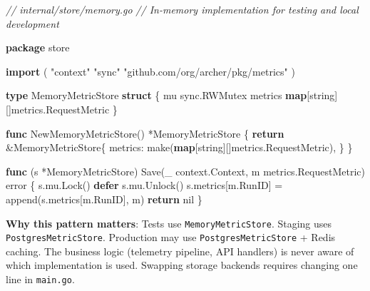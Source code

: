 \documentclass[
]{article}
\newenvironment{Shaded}{}{}
\newcommand{\BuiltInTok}[1]{\textcolor[rgb]{0.00,0.50,0.00}{#1}}
\newcommand{\CommentTok}[1]{\textcolor[rgb]{0.38,0.63,0.69}{\textit{#1}}}
\newcommand{\ControlFlowTok}[1]{\textcolor[rgb]{0.00,0.44,0.13}{\textbf{#1}}}
\newcommand{\DataTypeTok}[1]{\textcolor[rgb]{0.56,0.13,0.00}{#1}}
\newcommand{\KeywordTok}[1]{\textcolor[rgb]{0.00,0.44,0.13}{\textbf{#1}}}
\newcommand{\NormalTok}[1]{#1}
\newcommand{\OperatorTok}[1]{\textcolor[rgb]{0.40,0.40,0.40}{#1}}
\newcommand{\OtherTok}[1]{\textcolor[rgb]{0.00,0.44,0.13}{#1}}
\newcommand{\StringTok}[1]{\textcolor[rgb]{0.25,0.44,0.63}{#1}}
\begin{document}
\begin{Shaded}
\begin{Highlighting}[]
\CommentTok{// internal/store/memory.go}
\CommentTok{// In{-}memory implementation for testing and local development}

\KeywordTok{package}\NormalTok{ store}

\KeywordTok{import} \OperatorTok{(}
    \StringTok{"context"}
    \StringTok{"sync"}
    \StringTok{"github.com/org/archer/pkg/metrics"}
\OperatorTok{)}

\KeywordTok{type}\NormalTok{ MemoryMetricStore }\KeywordTok{struct} \OperatorTok{\{}
\NormalTok{    mu      sync}\OperatorTok{.}\NormalTok{RWMutex}
\NormalTok{    metrics }\KeywordTok{map}\OperatorTok{[}\DataTypeTok{string}\OperatorTok{][]}\NormalTok{metrics}\OperatorTok{.}\NormalTok{RequestMetric}
\OperatorTok{\}}

\KeywordTok{func}\NormalTok{ NewMemoryMetricStore}\OperatorTok{()} \OperatorTok{*}\NormalTok{MemoryMetricStore }\OperatorTok{\{}
    \ControlFlowTok{return} \OperatorTok{\&}\NormalTok{MemoryMetricStore}\OperatorTok{\{}
\NormalTok{        metrics}\OperatorTok{:} \BuiltInTok{make}\OperatorTok{(}\KeywordTok{map}\OperatorTok{[}\DataTypeTok{string}\OperatorTok{][]}\NormalTok{metrics}\OperatorTok{.}\NormalTok{RequestMetric}\OperatorTok{),}
    \OperatorTok{\}}
\OperatorTok{\}}

\KeywordTok{func} \OperatorTok{(}\NormalTok{s }\OperatorTok{*}\NormalTok{MemoryMetricStore}\OperatorTok{)}\NormalTok{ Save}\OperatorTok{(}\NormalTok{\_ context}\OperatorTok{.}\NormalTok{Context}\OperatorTok{,}\NormalTok{ m metrics}\OperatorTok{.}\NormalTok{RequestMetric}\OperatorTok{)} \DataTypeTok{error} \OperatorTok{\{}
\NormalTok{    s}\OperatorTok{.}\NormalTok{mu}\OperatorTok{.}\NormalTok{Lock}\OperatorTok{()}
    \ControlFlowTok{defer}\NormalTok{ s}\OperatorTok{.}\NormalTok{mu}\OperatorTok{.}\NormalTok{Unlock}\OperatorTok{()}
\NormalTok{    s}\OperatorTok{.}\NormalTok{metrics}\OperatorTok{[}\NormalTok{m}\OperatorTok{.}\NormalTok{RunID}\OperatorTok{]} \OperatorTok{=} \BuiltInTok{append}\OperatorTok{(}\NormalTok{s}\OperatorTok{.}\NormalTok{metrics}\OperatorTok{[}\NormalTok{m}\OperatorTok{.}\NormalTok{RunID}\OperatorTok{],}\NormalTok{ m}\OperatorTok{)}
    \ControlFlowTok{return} \OtherTok{nil}
\OperatorTok{\}}
\end{Highlighting}
\end{Shaded}

\textbf{Why this pattern matters}: Tests use \texttt{MemoryMetricStore}.
Staging uses \texttt{PostgresMetricStore}. Production may use
\texttt{PostgresMetricStore} + Redis caching. The business logic
(telemetry pipeline, API handlers) is never aware of which
implementation is used. Swapping storage backends requires changing one
line in \texttt{main.go}.
\end{document}
